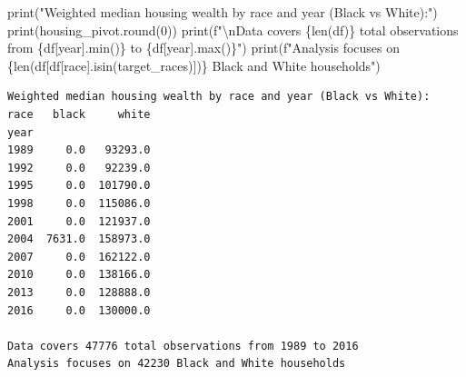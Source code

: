 \documentclass[
  letterpaper,
  DIV=11,
  numbers=noendperiod]{scrartcl}
\newenvironment{Shaded}{\begin{snugshade}}{\end{snugshade}}
\newcommand{\BuiltInTok}[1]{\textcolor[rgb]{0.00,0.23,0.31}{#1}}
\newcommand{\CharTok}[1]{\textcolor[rgb]{0.13,0.47,0.30}{#1}}
\newcommand{\DecValTok}[1]{\textcolor[rgb]{0.68,0.00,0.00}{#1}}
\newcommand{\NormalTok}[1]{\textcolor[rgb]{0.00,0.23,0.31}{#1}}
\newcommand{\SpecialCharTok}[1]{\textcolor[rgb]{0.37,0.37,0.37}{#1}}
\newcommand{\SpecialStringTok}[1]{\textcolor[rgb]{0.13,0.47,0.30}{#1}}
\newcommand{\StringTok}[1]{\textcolor[rgb]{0.13,0.47,0.30}{#1}}
\begin{document}
\begin{Shaded}
\begin{Highlighting}[]
\BuiltInTok{print}\NormalTok{(}\StringTok{"Weighted median housing wealth by race and year (Black vs White):"}\NormalTok{)}
\BuiltInTok{print}\NormalTok{(housing\_pivot.}\BuiltInTok{round}\NormalTok{(}\DecValTok{0}\NormalTok{))}
\BuiltInTok{print}\NormalTok{(}\SpecialStringTok{f"}\CharTok{\textbackslash{}n}\SpecialStringTok{Data covers }\SpecialCharTok{\{}\BuiltInTok{len}\NormalTok{(df)}\SpecialCharTok{\}}\SpecialStringTok{ total observations from }\SpecialCharTok{\{}\NormalTok{df[}\StringTok{\textquotesingle{}year\textquotesingle{}}\NormalTok{]}\SpecialCharTok{.}\BuiltInTok{min}\NormalTok{()}\SpecialCharTok{\}}\SpecialStringTok{ to }\SpecialCharTok{\{}\NormalTok{df[}\StringTok{\textquotesingle{}year\textquotesingle{}}\NormalTok{]}\SpecialCharTok{.}\BuiltInTok{max}\NormalTok{()}\SpecialCharTok{\}}\SpecialStringTok{"}\NormalTok{)}
\BuiltInTok{print}\NormalTok{(}\SpecialStringTok{f"Analysis focuses on }\SpecialCharTok{\{}\BuiltInTok{len}\NormalTok{(df[df[}\StringTok{\textquotesingle{}race\textquotesingle{}}\NormalTok{].isin(target\_races)])}\SpecialCharTok{\}}\SpecialStringTok{ Black and White households"}\NormalTok{)}
\end{Highlighting}
\end{Shaded}

\begin{verbatim}
Weighted median housing wealth by race and year (Black vs White):
race   black     white
year                  
1989     0.0   93293.0
1992     0.0   92239.0
1995     0.0  101790.0
1998     0.0  115086.0
2001     0.0  121937.0
2004  7631.0  158973.0
2007     0.0  162122.0
2010     0.0  138166.0
2013     0.0  128888.0
2016     0.0  130000.0

Data covers 47776 total observations from 1989 to 2016
Analysis focuses on 42230 Black and White households
\end{verbatim}
\end{document}
